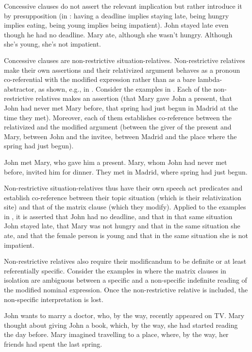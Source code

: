 \documentclass[output=paper,
colorlinks,
citecolor=brown,
newtxmath
]{langscibook}
\begin{document}
Concessive clauses do not assert the relevant implication but rather introduce it by presupposition (in : having a deadline implies staying late, being hungry implies eating, being young implies being impatient).
\ea\label{ex:Concess1}
\ea John stayed late even though he had no deadline.
\ex Mary ate, although she wasn't hungry.
\ex Although she's young, she's not impatient.
\z\z

\noindent Concessive clauses are non-restrictive situation-relatives. Non-restrictive relatives make their own assertions and their relativized argument behaves as a pronoun co-referential with the modified expression rather than as a bare lambda-abstractor, as shown, e.g., in \citet{Vries2002}. Consider the examples in . Each of the non-restrictive relatives makes an assertion (that Mary gave John a present, that John had never met Mary before, that spring had just begun in Madrid at the time they met). Moreover, each of them establishes co-reference between the relativized and the modified argument (between the giver of the present and Mary, between John and the invitee, between Madrid and the place where the spring had just begun).

\ea\label{ex:RealRel1}
\ea John met Mary, who gave him a present.
\ex Mary, whom John had never met before, invited him for dinner.
\ex They met in Madrid, where spring had just begun.
\z\z

\noindent Non-restrictive situation-relatives thus have their own speech act predicates and establish co-reference between their topic situation (which is their relativization site) and that of the matrix clause (which they modify). Applied to the examples in , it is asserted that John had no deadline, and that in that same situation John stayed late, that Mary was not hungry and that in the same situation she ate, and that the female person is young and that in the same situation she is not impatient.

Non-restrictive relatives also require their modificandum to be definite or at least referentially specific. Consider the examples in  where the matrix clauses in isolation are ambiguous between a specific and a non-specific indefinite reading of the modified nominal expression. Once the non-restrictive relative is included, the non-specific interpretation is lost.

\ea\label{ex:RealRel2}
\ea John wants to marry a doctor, who, by the way, recently appeared on TV.
\ex Mary thought about giving John a book, which, by the way, she had started reading the day before.
\ex Mary imagined travelling to a place, where, by the way, her friends had spent the last spring.
\z\z
\end{document}
